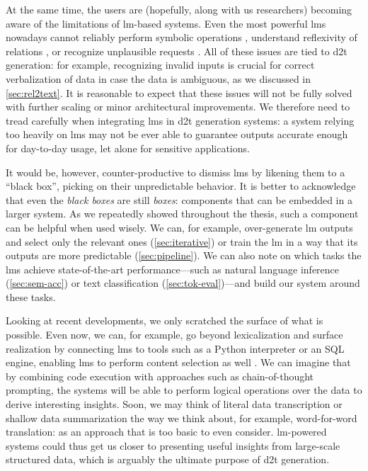 At the same time, the users are (hopefully, along with us researchers) becoming aware of the limitations of \ac{lm}-based systems. Even the most powerful \acp{lm} nowadays cannot reliably perform symbolic operations \cite{qian2023limitations}, understand reflexivity of relations \cite{berglund2024the}, or recognize unplausible requests \cite{yin2023large}. All of these issues are tied to \ac{d2t} generation: for example, recognizing invalid inputs is crucial for correct verbalization of data in case the data is ambiguous, as we discussed in \autoref{sec:rel2text}. It is reasonable to expect that these issues will not be fully solved with further scaling or minor architectural improvements. We therefore need to tread carefully when integrating \acp{lm} in \ac{d2t} generation systems: a system relying too heavily on \acp{lm} may not be ever able to guarantee outputs accurate enough for day-to-day usage, let alone for sensitive applications.

It would be, however, counter-productive to dismiss \acp{lm} by likening them to a ``black box'', picking on their unpredictable behavior. It is better to acknowledge that even the \emph{black boxes} are still \emph{boxes}: components that can be embedded in a larger system. As we repeatedly showed throughout the thesis, such a component can be helpful when used wisely. We can, for example, over-generate \ac{lm} outputs and select only the relevant ones (\autoref{sec:iterative}) or train the \ac{lm} in a way that its outputs are more predictable (\autoref{sec:pipeline}). We can also note on which tasks the \acp{lm} achieve state-of-the-art performance---such as natural language inference (\autoref{sec:sem-acc}) or text classification (\autoref{sec:tok-eval})---and build our system around these tasks.

Looking at recent developments, we only scratched the surface of what is possible. Even now, we can, for example, go beyond lexicalization and surface realization by connecting \acp{lm} to tools such as a Python interpreter or an SQL engine, enabling \acp{lm} to perform content selection as well \cite{cao-etal-2023-api,jiang-etal-2023-structgpt,gemmell2023generate}. We can imagine that by combining code execution with approaches such as chain-of-thought prompting, the systems will be able to perform logical operations over the data to derive interesting insights. Soon, we may think of literal data transcription or shallow data summarization the way we think about, for example, word-for-word translation: as an approach that is too basic to even consider. \ac{lm}-powered systems could thus get us closer to presenting useful insights from large-scale structured data, which is arguably the ultimate purpose of \ac{d2t} generation.

